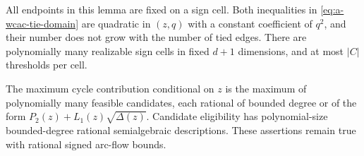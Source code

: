 All endpoints in this lemma are fixed on a sign cell. Both inequalities
in \eqref{eq:a-wcac-tie-domain} are quadratic in $(z,q)$ with a constant
coefficient of $q^2$, and their number does not grow with the number of
tied edges. There are polynomially many realizable sign cells in fixed
$d+1$ dimensions, and at most $|C|$ thresholds per cell.

\begin{lemma}
\label{lem:a-wcac-candidates}
The maximum cycle contribution conditional on $z$ is the maximum of
polynomially many feasible candidates, each rational of bounded degree
or of the form $P_2(z)+L_1(z)\sqrt{\Delta(z)}$. Candidate eligibility has
polynomial-size bounded-degree rational semialgebraic descriptions.
These assertions remain true with rational signed arc-flow bounds.
\end{lemma}
